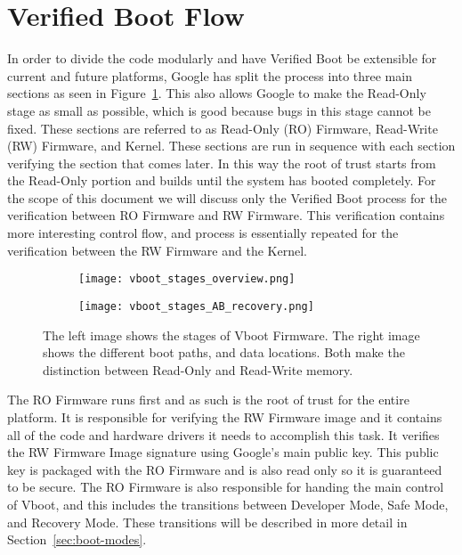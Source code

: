 \section{Verified Boot Flow}

In order to divide the code modularly and have Verified Boot be extensible for current and future platforms, Google has split the process into three main sections as seen in Figure~\ref{fig:vboot_stages_overview}.
This also allows Google to make the Read-Only stage as small as possible, which is good because bugs in this stage cannot be fixed.
These sections are referred to as Read-Only (RO) Firmware, Read-Write
(RW) Firmware, and Kernel.
These sections are run in sequence with each section verifying the section that comes later.
In this way the root of trust starts from the Read-Only portion and builds until the system has booted completely.
For the scope of this document we will discuss only the Verified Boot process for the verification between RO Firmware and RW Firmware. 
This verification contains more interesting control flow, and process is essentially repeated for the verification between the RW Firmware and the Kernel.

\begin{figure}
\begin{subfigure}{.4\textwidth}
  \centering
  \texttt{[image: vboot\_stages\_overview.png]}
\end{subfigure}
\begin{subfigure}{.60\textwidth}
  \centering
  \texttt{[image: vboot\_stages\_AB\_recovery.png]}
\end{subfigure}
\caption{The left image shows the stages of Vboot Firmware. The right image
shows the different boot paths, and data locations. Both make the distinction
between Read-Only and Read-Write memory.}
\label{fig:vboot_stages_overview}
\end{figure}

The RO Firmware runs first and as such is the root of trust for the entire platform.
It is responsible for verifying the RW Firmware image and it contains all of the code and hardware drivers it needs to accomplish this task.
It verifies the RW Firmware Image signature using Google's main public key.
This public key is packaged with the RO Firmware and is also read only so it is guaranteed to be secure.
The RO Firmware is also responsible for handing the main control of Vboot, and this includes the transitions between Developer Mode, Safe Mode, and Recovery Mode.
These transitions will be described in more detail in Section~\ref{sec:boot-modes}.

